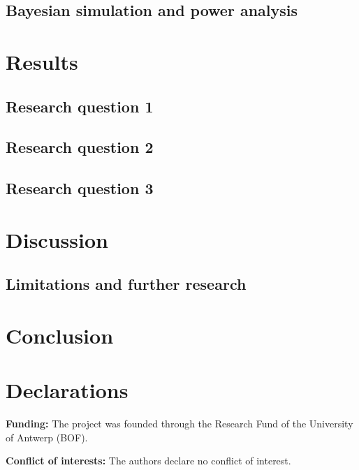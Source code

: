 \documentclass[
  authoryear,
  preprint,
  1p]{elsarticle}
\begin{document}
\subsection{Bayesian simulation and power
analysis}\label{bayesian-simulation-and-power-analysis}

\section{Results}\label{sec-results}

\subsection{Research question 1}\label{sec-RQ1}

\subsection{Research question 2}\label{sec-RQ2}

\subsection{Research question 3}\label{sec-RQ3}

\section{Discussion}\label{sec-discussion}

\subsection{Limitations and further research}\label{sec-LFR}

\section{Conclusion}\label{sec-conclusion}

\newpage{}

\section*{Declarations}\label{declarations}

\textbf{Funding:} The project was founded through the Research Fund of
the University of Antwerp (BOF).

\textbf{Conflict of interests:} The authors declare no conflict of
interest.
\end{document}
